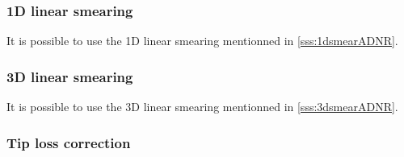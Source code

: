 \subsubsection*{1D linear smearing}
It is possible to use the 1D linear smearing mentionned in \ref{sss:1dsmearADNR}.

\subsubsection*{3D linear smearing}
It is possible to use the 3D linear smearing mentionned in \ref{sss:3dsmearADNR}.

\subsubsection*{Tip loss correction}
\label{sss:tiplossALM}

